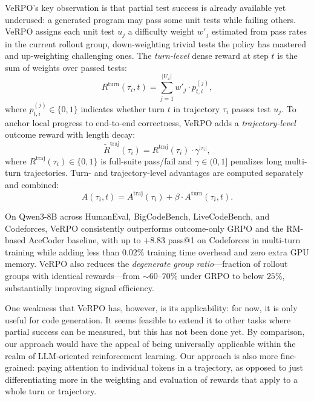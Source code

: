 \documentclass[times, 10pt,twocolumn]{article}
\begin{document}
VeRPO's key observation is that partial test success is already available yet
underused: a generated program may pass some unit tests while failing others.
VeRPO assigns each unit test $u_j$ a difficulty weight $w'_j$ estimated
from pass rates in the current rollout group, down-weighting trivial tests the
policy has mastered and up-weighting challenging ones. The \emph{turn-level}
dense reward at step $t$ is the sum of weights over passed tests:
\begin{equation}
R^{\mathrm{turn}}(\tau_i, t)
= \sum_{j=1}^{|U_x|} w'_j \cdot p^{(j)}_{t,i},
\end{equation}
where $p^{(j)}_{t,i} \in \{0,1\}$ indicates whether turn $t$ in trajectory
$\tau_i$ passes test $u_j$. To anchor local progress to end-to-end correctness,
VeRPO adds a \emph{trajectory-level} outcome reward with length decay:
\begin{equation}
\tilde{R}^{\mathrm{traj}}(\tau_i)
= R^{\mathrm{traj}}(\tau_i)\cdot \gamma^{|\tau_i|},
\end{equation}
where $R^{\mathrm{traj}}(\tau_i) \in \{0,1\}$ is full-suite pass/fail and
$\gamma \in (0,1]$ penalizes long multi-turn trajectories. Turn- and
trajectory-level advantages are computed separately and combined:
\begin{equation}
A(\tau_i, t) = A^{\mathrm{traj}}(\tau_i) + \beta \cdot A^{\mathrm{turn}}(\tau_i, t).
\end{equation}

On Qwen3-8B across HumanEval, BigCodeBench, LiveCodeBench, and Codeforces,
VeRPO consistently outperforms outcome-only GRPO and the RM-based AceCoder
baseline, with up to $+8.83$ pass@1 on Codeforces in multi-turn training while
adding less than $0.02\%$ training time overhead and zero extra GPU memory.
VeRPO also reduces the \emph{degenerate group ratio}---fraction of rollout
groups with identical rewards---from ${\sim}60$--$70\%$ under GRPO to below
$25\%$, substantially improving signal efficiency.

One weakness that VeRPO has, however, is its applicability: for now, it is only useful for code generation. It seems feasible to extend it to other tasks where partial success can be measured, but this has not been done yet. By comparison, our approach would have the appeal of being universally applicable within the realm of LLM-oriented reinforcement learning. Our approach is also more fine-grained: paying attention to individual tokens in a trajectory, as opposed to just differentiating more in the weighting and evaluation of rewards that apply to a whole turn or trajectory.
\end{document}
